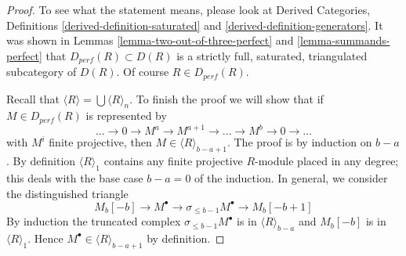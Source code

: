 \documentclass[10pt,a4paper]{amsart}
\theoremstyle{plain}
\theoremstyle{definition}
\theoremstyle{remark}
\numberwithin{equation}{subsection}
\begin{document}
\begin{proof}
To see what the statement means, please look at
Derived Categories, Definitions \ref{derived-definition-saturated} and
\ref{derived-definition-generators}.
It was shown in Lemmas \ref{lemma-two-out-of-three-perfect} and
\ref{lemma-summands-perfect} that $D_{perf}(R) \subset D(R)$
is a strictly full, saturated, triangulated subcategory of $D(R)$.
Of course $R \in D_{perf}(R)$.

\medskip\noindent
Recall that $\langle R \rangle = \bigcup \langle R \rangle_n$.
To finish the proof we will show that if $M \in D_{perf}(R)$
is represented by
$$
\ldots \to 0 \to M^a \to M^{a + 1} \to \ldots \to M^b \to 0 \to \ldots
$$
with $M^i$ finite projective, then $M \in \langle R \rangle_{b - a + 1}$.
The proof is by induction on $b - a$.
By definition $\langle R \rangle_1$ contains any finite projective
$R$-module placed in any degree; this deals with the base case
$b - a = 0$ of the induction. In general, we consider the distinguished
triangle
$$
M_b[-b] \to M^\bullet \to \sigma_{\leq b - 1}M^\bullet \to M_b[-b + 1]
$$
By induction the truncated complex $\sigma_{\leq b - 1}M^\bullet$ is
in $\langle R \rangle_{b - a}$ and $M_b[-b]$ is in $\langle R \rangle_1$.
Hence $M^\bullet \in \langle R \rangle_{b - a + 1}$ by definition.
\end{proof}
\end{document}
